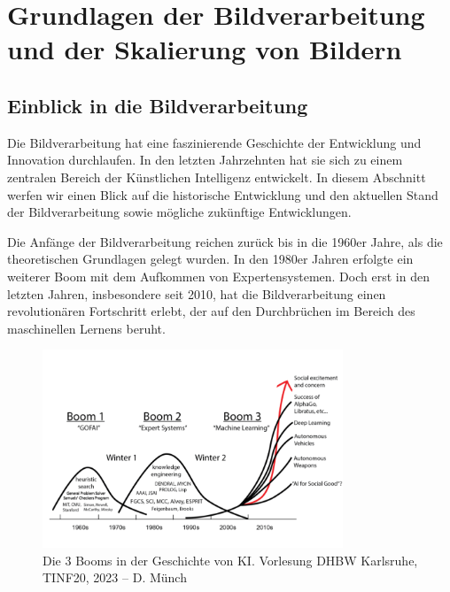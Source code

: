 



\chapter{Grundlagen der Bildverarbeitung und der Skalierung von Bildern}

\section{Einblick in die Bildverarbeitung}

Die Bildverarbeitung hat eine faszinierende Geschichte der Entwicklung und Innovation durchlaufen.
In den letzten Jahrzehnten hat sie sich zu einem zentralen Bereich der Künstlichen Intelligenz entwickelt.
In diesem Abschnitt werfen wir einen Blick auf die historische Entwicklung und den aktuellen Stand der Bildverarbeitung sowie mögliche zukünftige Entwicklungen.

Die Anfänge der Bildverarbeitung reichen zurück bis in die 1960er Jahre, als die theoretischen Grundlagen gelegt wurden.
In den 1980er Jahren erfolgte ein weiterer Boom mit dem Aufkommen von Expertensystemen.
Doch erst in den letzten Jahren, insbesondere seit 2010, hat die Bildverarbeitung einen revolutionären Fortschritt erlebt, der auf den Durchbrüchen im Bereich des maschinellen Lernens beruht.

\begin{figure}[h]
    \centering
    \includegraphics[width=0.8\textwidth]{img/history_bildverarbeitung.png}
    \caption{Die 3 Booms in der Geschichte von KI. Vorlesung DHBW Karlsruhe, TINF20, 2023 – D. Münch}
    \label{fig:history_bildverarbeitung}
\end{figure}

